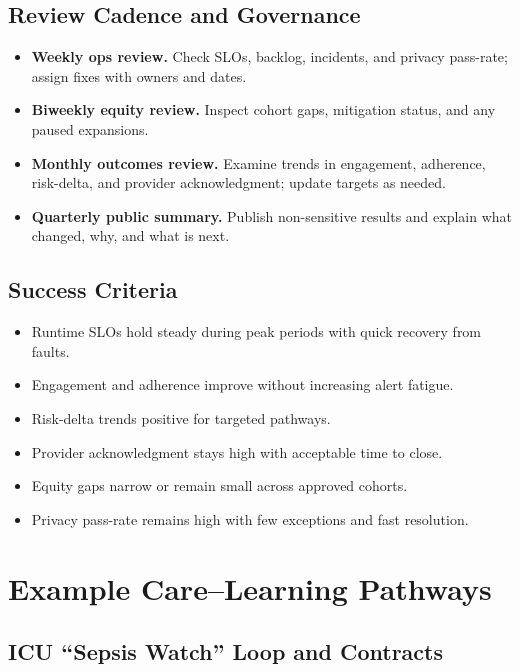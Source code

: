 \documentclass[12pt]{article}
\begin{document}
\subsection*{Review Cadence and Governance}
\begin{itemize}[leftmargin=*]
  \item \textbf{Weekly ops review.} Check SLOs, backlog, incidents, and privacy pass-rate; assign fixes with owners and dates.
  \item \textbf{Biweekly equity review.} Inspect cohort gaps, mitigation status, and any paused expansions.
  \item \textbf{Monthly outcomes review.} Examine trends in engagement, adherence, risk-delta, and provider acknowledgment; update targets as needed.
  \item \textbf{Quarterly public summary.} Publish non-sensitive results and explain what changed, why, and what is next.
\end{itemize}

\subsection*{Success Criteria}
\begin{itemize}[leftmargin=*]
  \item Runtime SLOs hold steady during peak periods with quick recovery from faults.
  \item Engagement and adherence improve without increasing alert fatigue.
  \item Risk-delta trends positive for targeted pathways.
  \item Provider acknowledgment stays high with acceptable time to close.
  \item Equity gaps narrow or remain small across approved cohorts.
  \item Privacy pass-rate remains high with few exceptions and fast resolution.
\end{itemize}


\section{Example Care–Learning Pathways}

\subsection*{ICU “Sepsis Watch” Loop and Contracts}
\end{document}
